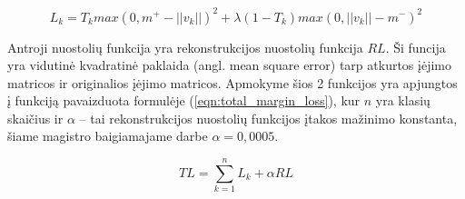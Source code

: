 \begin{equation}
\label{eqn:margin_loss}
	L_{k} = T_k max(0, m^+ - ||v_k||)^2 + \lambda (1 - T_k) max(0, ||v_k|| - m^-)^2
\end{equation}

Antroji nuostolių funkcija yra rekonstrukcijos nuostolių funkcija $RL$. Ši funcija yra vidutinė kvadratinė paklaida (angl. mean square error) tarp atkurtos įėjimo matricos ir originalios įėjimo matricos. Apmokyme šios 2 funkcijos yra apjungtos į funkciją pavaizduota formulėje (\ref{eqn:total_margin_loss}), kur $n$ yra klasių skaičius ir $\alpha$ -- tai rekonstrukcijos nuostolių funkcijos įtakos mažinimo konstanta, šiame magistro baigiamajame darbe $\alpha = 0,0005$.

\begin{equation}
\label{eqn:total_margin_loss}
	TL = \sum_{k = 1}^{n} L_{k} + \alpha RL
\end{equation}
